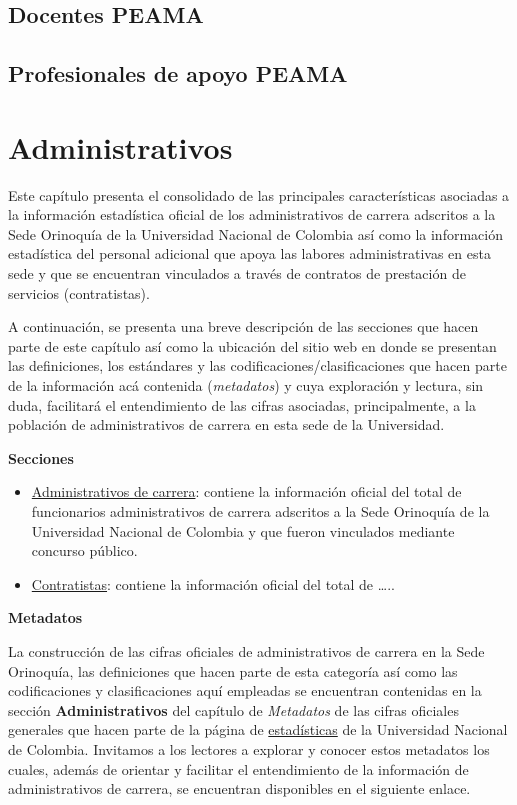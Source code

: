 \documentclass[
]{book}
\begin{document}
\hypertarget{DocPEAMA}{%
\section{Docentes PEAMA}\label{DocPEAMA}}

\hypertarget{DocApo}{%
\section{Profesionales de apoyo PEAMA}\label{DocApo}}

\hypertarget{Admi}{%
\chapter{Administrativos}\label{Admi}}

Este capítulo presenta el consolidado de las principales características asociadas a la información estadística oficial de los administrativos de carrera adscritos a la Sede Orinoquía de la Universidad Nacional de Colombia así como la información estadística del personal adicional que apoya las labores administrativas en esta sede y que se encuentran vinculados a través de contratos de prestación de servicios (contratistas).

A continuación, se presenta una breve descripción de las secciones que hacen parte de este capítulo así como la ubicación del sitio web en donde se presentan las definiciones, los estándares y las codificaciones/clasificaciones que hacen parte de la información acá contenida (\emph{metadatos}) y cuya exploración y lectura, sin duda, facilitará el entendimiento de las cifras asociadas, principalmente, a la población de administrativos de carrera en esta sede de la Universidad.

\textbf{Secciones}

\begin{itemize}
\item
  \protect\hyperlink{AdmCar}{Administrativos de carrera}: contiene la información oficial del total de funcionarios administrativos de carrera adscritos a la Sede Orinoquía de la Universidad Nacional de Colombia y que fueron vinculados mediante concurso público.
\item
  \protect\hyperlink{Contrat}{Contratistas}: contiene la información oficial del total de \ldots..
\end{itemize}

\textbf{Metadatos}

La construcción de las cifras oficiales de administrativos de carrera en la Sede Orinoquía, las definiciones que hacen parte de esta categoría así como las codificaciones y clasificaciones aquí empleadas se encuentran contenidas en la sección \textbf{Administrativos} del capítulo de \emph{Metadatos} de las cifras oficiales generales que hacen parte de la página de \href{http://estadisticas.unal.edu.co/home/}{estadísticas} de la Universidad Nacional de Colombia. Invitamos a los lectores a explorar y conocer estos metadatos los cuales, además de orientar y facilitar el entendimiento de la información de administrativos de carrera, se encuentran disponibles en el siguiente enlace.
\end{document}
